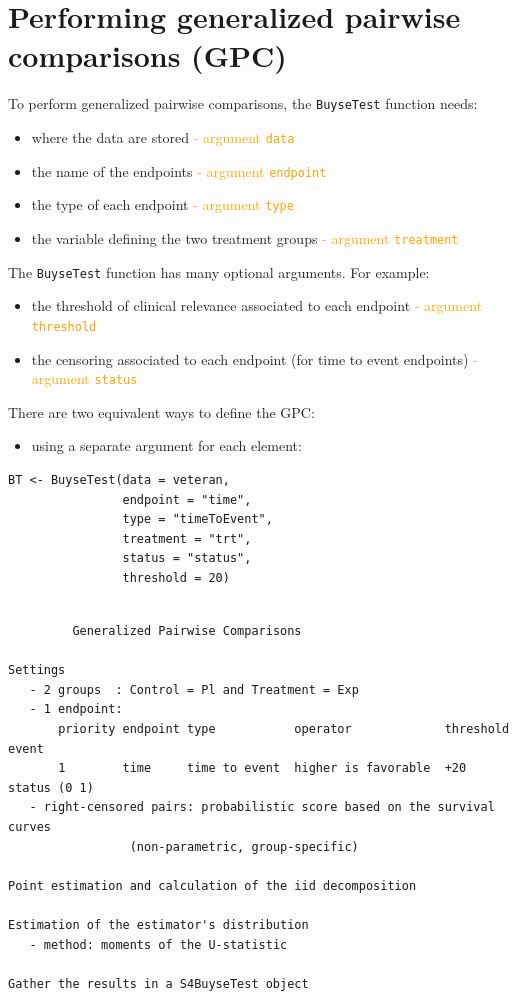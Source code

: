 \documentclass[12pt]{article}
\begin{document}
\clearpage

\section{Performing generalized pairwise comparisons (GPC)}
\label{sec:org33445a7}

To perform generalized pairwise comparisons, the \texttt{BuyseTest} function needs:
\begin{itemize}
\item where the data are stored \hfill \textcolor{orange}{- argument \texttt{data}}
\item the name of the endpoints \hfill \textcolor{orange}{- argument \texttt{endpoint}}
\item the type of each endpoint \hfill \textcolor{orange}{- argument \texttt{type}}
\item the variable defining the two treatment groups \hfill
\textcolor{orange}{- argument \texttt{treatment}}
\end{itemize}
The \texttt{BuyseTest} function has many optional arguments. For example:
\begin{itemize}
\item the threshold of clinical relevance associated to each endpoint \hfill \textcolor{orange}{- argument \texttt{threshold}}
\item the censoring associated to each endpoint (for time to event endpoints) \hfill \textcolor{orange}{- argument \texttt{status}}
\end{itemize}

\bigskip

There are two equivalent ways to define the GPC: 
\begin{itemize}
\item using a separate argument for each element:
\end{itemize}

\lstset{language=r,label= ,caption= ,captionpos=b,numbers=none}
\begin{lstlisting}
BT <- BuyseTest(data = veteran, 
                endpoint = "time", 
                type = "timeToEvent", 
                treatment = "trt", 
                status = "status", 
                threshold = 20)
\end{lstlisting}

\begin{verbatim}

         Generalized Pairwise Comparisons

Settings 
   - 2 groups  : Control = Pl and Treatment = Exp
   - 1 endpoint: 
       priority endpoint type           operator             threshold event       
       1        time     time to event  higher is favorable  +20       status (0 1)
   - right-censored pairs: probabilistic score based on the survival curves 
 			     (non-parametric, group-specific) 

Point estimation and calculation of the iid decomposition

Estimation of the estimator's distribution 
   - method: moments of the U-statistic

Gather the results in a S4BuyseTest object
\end{verbatim}
\end{document}
